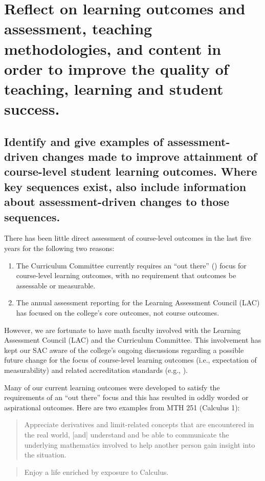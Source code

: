 \chapter[Outcomes and Assessment]{Reflect on learning outcomes and assessment,
teaching methodologies, and content in order to improve the quality of teaching,
learning and student success.}

\section[Course-Level Outcomes]{Identify and give examples of assessment-driven
changes made to improve attainment of course-level student learning outcomes.
Where key sequences exist, also include information about assessment-driven
changes to those sequences.}

There has been little direct assessment of course-level outcomes in the last
five years for the following two reasons: 
\begin{enumerate}
\item The Curriculum Committee currently requires an ``out there''
  (\cite{courseoutcomes}) focus for course-level learning outcomes, with no
  requirement that outcomes be assessable or measurable.  
\item The annual assessment reporting for the Learning Assessment Council (LAC)
  has focused on the college's core outcomes, not course outcomes.  
\end{enumerate}


However, we are fortunate to have math faculty involved with the Learning
Assessment Council (LAC) and the Curriculum Committee. This involvement has kept
our SAC aware of the college's ongoing discussions regarding a possible future
change for the focus of course-level learning outcomes  (i.e., expectation of
measurability) and related accreditation standards (e.g., \cite[Standard
4.A.3]{NWCCU}).

Many of our current learning outcomes were developed to satisfy the requirements
of an ``out there'' focus and this has resulted in oddly worded or aspirational
outcomes.  Here are two examples from MTH 251 (Calculus 1):

\begin{quote}
Appreciate derivatives and limit-related concepts that are encountered in the
real world, [and] understand and be able to communicate the underlying
mathematics involved to help another person gain insight into the situation.
\end{quote}
\begin{quote}
Enjoy a life enriched by exposure to Calculus.
\end{quote}

